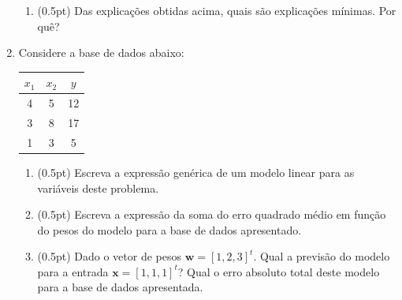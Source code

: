 \documentclass{article}
\begin{document}
\begin{enumerate}
\begin{enumerate}
        \item (0.5pt) Das explicações obtidas acima, quais são explicações mínimas. Por quê?
        
        
    \end{enumerate}
    \pagebreak
    
    \item Considere a base de dados abaixo:
    
    \begin{table}[!h]
        \centering
        \begin{tabular}{c|c|c}
             $x_1$ & $x_2$ & $y$\\
             \hline
              4 & 5 & 12 \\
              3 & 8 & 17 \\
              1 & 3 & 5 \\ %
        \end{tabular}
        \label{tab:my_label}
    \end{table}
    
    \begin{enumerate}
        \item (0.5pt) Escreva a expressão genérica de um modelo linear para as variáveis deste problema.
        
    
        \item (0.5pt) Escreva a expressão da soma do erro quadrado médio em função do pesos do modelo para a base de dados apresentado.
        
    
        \item (0.5pt) Dado o vetor de pesos $\mathbf{w} = [1,2,3]^t$. Qual a previsão do modelo para a entrada $\mathbf{x} = [1,1,1]^t$? Qual o erro absoluto total deste modelo para a base de dados apresentada.
        
        

\end{enumerate}
\end{enumerate}
\end{document}
